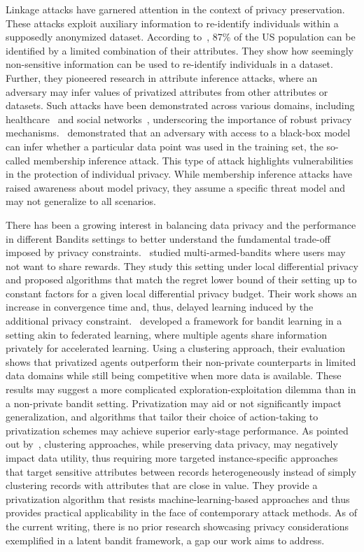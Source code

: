 \documentclass{article}
\begin{document}
Linkage attacks have garnered attention in the context of privacy preservation. These attacks exploit auxiliary information to re-identify individuals within a supposedly anonymized dataset. According to~\citet{Sweeny2002}, 87\% of the US population can be identified by a limited combination of their attributes. They show how seemingly non-sensitive information can be used to re-identify individuals in a dataset. Further, they pioneered research in attribute inference attacks, where an adversary may infer values of privatized attributes from other attributes or datasets. Such attacks have been demonstrated across various domains, including healthcare~\citet{reidentmajorattack} and social networks~\citet{Gulyas2016}, underscoring the importance of robust privacy mechanisms.~\citep{Shokri2017} demonstrated that an adversary with access to a black-box model can infer whether a particular data point was used in the training set, the so-called membership inference attack. This type of attack highlights vulnerabilities in the protection of individual privacy. While membership inference attacks have raised awareness about model privacy, they assume a specific threat model and may not generalize to all scenarios. 

There has been a growing interest in balancing data privacy and the performance in different Bandits settings to better understand the fundamental trade-off imposed by privacy constraints.~\citet{Wenbo2020} studied multi-armed-bandits where users may not want to share rewards. They study this setting under local differential privacy and proposed algorithms that match the regret lower bound of their setting up to constant factors for a given local differential privacy budget. Their work shows an increase in convergence time and, thus, delayed learning induced by the additional privacy constraint.~\citet{Malekzadeh2020} developed a framework for bandit learning in a setting akin to federated learning, where multiple agents share information privately for accelerated learning. Using a clustering approach, their evaluation shows that privatized agents outperform their non-private counterparts in limited data domains while still being competitive when more data is available. These results may suggest a more complicated exploration-exploitation dilemma than in a non-private bandit setting. Privatization may aid or not significantly impact generalization, and algorithms that tailor their choice of action-taking to privatization schemes may achieve superior early-stage performance. As pointed out by~\citet{Gkountouna2022}, clustering approaches, while preserving data privacy, may negatively impact data utility, thus requiring more targeted instance-specific approaches that target sensitive attributes between records heterogeneously instead of simply clustering records with attributes that are close in value. They provide a privatization algorithm that resists machine-learning-based approaches and thus provides practical applicability in the face of contemporary attack methods. As of the current writing, there is no prior research showcasing privacy considerations exemplified in a latent bandit framework, a gap our work aims to address.
\end{document}
